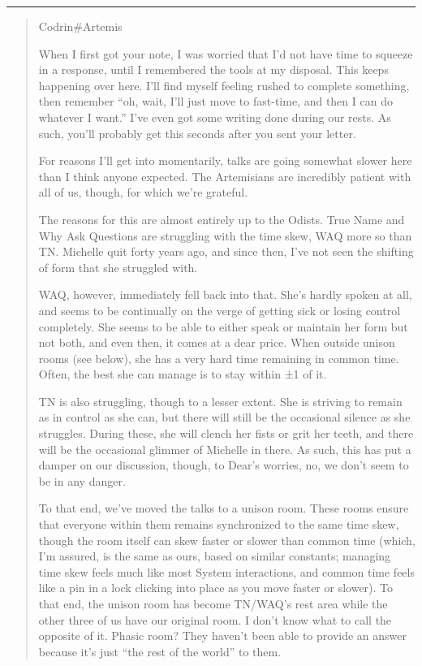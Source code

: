 \begin{center}\rule{0.5\linewidth}{0.5pt}\end{center}

\begin{quote}
Codrin\#Artemis

When I first got your note, I was worried that I'd not have time to squeeze in a response, until I remembered the tools at my disposal. This keeps happening over here. I'll find myself feeling rushed to complete something, then remember ``oh, wait, I'll just move to fast-time, and then I can do whatever I want.'' I've even got some writing done during our rests. As such, you'll probably get this seconds after you sent your letter.

For reasons I'll get into momentarily, talks are going somewhat slower here than I think anyone expected. The Artemisians are incredibly patient with all of us, though, for which we're grateful.

The reasons for this are almost entirely up to the Odists. True Name and Why Ask Questions are struggling with the time skew, WAQ more so than TN. Michelle quit forty years ago, and since then, I've not seen the shifting of form that she struggled with.

WAQ, however, immediately fell back into that. She's hardly spoken at all, and seems to be continually on the verge of getting sick or losing control completely. She seems to be able to either speak or maintain her form but not both, and even then, it comes at a dear price. When outside unison rooms (see below), she has a very hard time remaining in common time. Often, the best she can manage is to stay within ±1 of it.

TN is also struggling, though to a lesser extent. She is striving to remain as in control as she can, but there will still be the occasional silence as she struggles. During these, she will clench her fists or grit her teeth, and there will be the occasional glimmer of Michelle in there. As such, this has put a damper on our discussion, though, to Dear's worries, no, we don't seem to be in any danger.

To that end, we've moved the talks to a unison room. These rooms ensure that everyone within them remains synchronized to the same time skew, though the room itself can skew faster or slower than common time (which, I'm assured, is the same as ours, based on similar constants; managing time skew feels much like most System interactions, and common time feels like a pin in a lock clicking into place as you move faster or slower). To that end, the unison room has become TN/WAQ's rest area while the other three of us have our original room. I don't know what to call the opposite of it. Phasic room? They haven't been able to provide an answer because it's just ``the rest of the world'' to them.


\end{quote}
